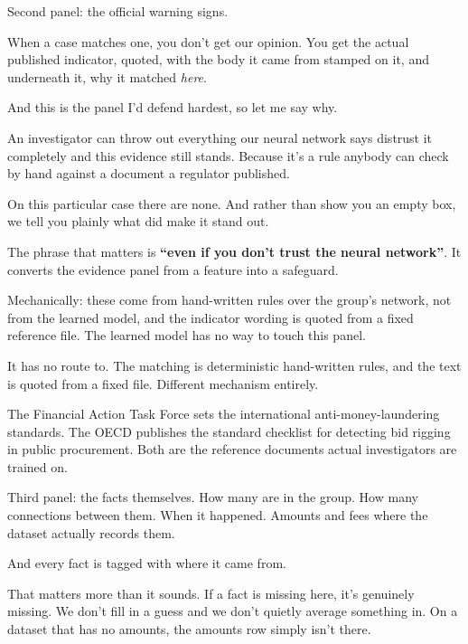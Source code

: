 \documentclass[11pt]{article}
\begin{document}

\begin{saythis}
Second panel: the official warning signs.

When a case matches one, you don't get our opinion. You get the actual
published indicator, quoted, with the body it came from stamped on it, and
underneath it, why it matched \emph{here}.

And this is the panel I'd defend hardest, so let me say why.

An investigator can throw out everything our neural network says \bt distrust
it completely \bt and this evidence still stands. Because it's a rule anybody
can check by hand against a document a regulator published.

On this particular case there are none. And rather than show you an empty box,
we tell you plainly what did make it stand out.
\end{saythis}

\begin{means}
The phrase that matters is \textbf{``even if you don't trust the neural
network''}. It converts the evidence panel from a feature into a safeguard.

Mechanically: these come from hand-written rules over the group's network, not
from the learned model, and the indicator wording is quoted from a fixed
reference file. The learned model has no way to touch this panel.
\end{means}

\begin{asked}
 It has no route to. The
matching is deterministic hand-written rules, and the text is quoted from a
fixed file. Different mechanism entirely.

 The Financial Action Task Force sets the
international anti-money-laundering standards. The OECD publishes the standard
checklist for detecting bid rigging in public procurement. Both are the
reference documents actual investigators are trained on.
\end{asked}


\begin{saythis}
Third panel: the facts themselves. How many are in the group. How many
connections between them. When it happened. Amounts and fees where the dataset
actually records them.

And every fact is tagged with where it came from.

That matters more than it sounds. If a fact is missing here, it's genuinely
missing. We don't fill in a guess and we don't quietly average something in. On
a dataset that has no amounts, the amounts row simply isn't there.
\end{saythis}
\end{document}
